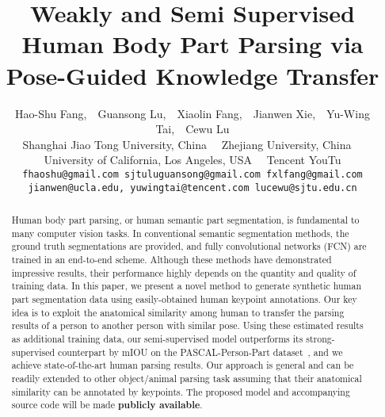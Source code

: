 \documentclass[10pt,twocolumn,letterpaper]{article}
\begin{document}
\title{Weakly and Semi Supervised Human Body Part Parsing via Pose-Guided Knowledge Transfer}

\author{Hao-Shu Fang,~~Guansong Lu,~~Xiaolin Fang\footnotemark[1],~~Jianwen Xie,~~Yu-Wing Tai,~~Cewu Lu\footnotemark[2]\\
Shanghai Jiao Tong University, China~~ Zhejiang University, China~~\\
University of California, Los Angeles, USA~~ Tencent YouTu\\
{\tt\small fhaoshu@gmail.com sjtuluguansong@gmail.com fxlfang@gmail.com}\\
{\tt\small jianwen@ucla.edu, yuwingtai@tencent.com lucewu@sjtu.edu.cn}}


\maketitle
\renewcommand{\thefootnote}{\fnsymbol{footnote}}
\begin{abstract}
Human body part parsing, or human semantic part segmentation, is fundamental to many computer vision tasks. In conventional semantic segmentation methods, the ground truth segmentations are provided, and fully convolutional networks (FCN) are trained in an end-to-end scheme. Although these methods have demonstrated impressive results, their performance highly depends on the quantity and quality of training data. In this paper, we present a novel method to generate synthetic human part segmentation data using easily-obtained human keypoint annotations. Our key idea is to exploit the anatomical similarity among human to transfer the parsing results of a person to another person with similar pose. Using these estimated results as additional training data, our semi-supervised model outperforms its strong-supervised counterpart by  mIOU on the PASCAL-Person-Part dataset~\cite{chen2014detect}, and we achieve state-of-the-art human parsing results. Our approach is general and can be readily extended to other object/animal parsing task assuming that their anatomical similarity can be annotated by keypoints. The proposed model and accompanying source code will be made \textbf{publicly available}.
\end{abstract}


\vspace{-3mm}
\end{document}
